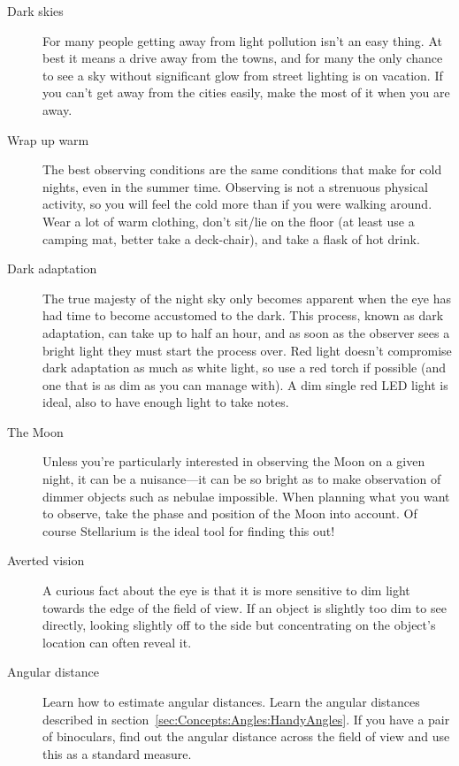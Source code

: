\begin{description}
\item[Dark skies] For many people getting away from light pollution
isn't an easy thing. At best it means a drive away from the towns, and
for many the only chance to see a sky without significant glow from
street lighting is on vacation. If you can't get away from the cities
easily, make the most of it when you are away.

\item[Wrap up warm] The best observing conditions are the same
conditions that make for cold nights, even in the summer time. Observing
is not a strenuous physical activity, so you will feel the cold %
more than if you were walking around. Wear a lot of warm clothing, don't
sit/lie on the floor (at least use a camping mat, better take a
deck-chair), and take a flask of hot drink.

\item[Dark adaptation] The true majesty of the night sky only
becomes apparent when the eye has had time to become accustomed to the
dark.  This process, known as dark adaptation, can take up to half an
hour, and as soon as the observer sees a bright light they must start
the process over. Red light doesn't compromise dark adaptation as much
as white light, so use a red torch if possible (and one that is as dim
as you can manage with). A dim single red LED light is ideal, also to
have enough light to take notes.

\item[The Moon] Unless you're particularly interested in observing the
Moon on a given night, it can be a nuisance---it can be so bright as
to make observation of dimmer objects such as nebulae impossible. When
planning what you want to observe, take the phase and position of the
Moon into account. Of course Stellarium is the ideal tool for finding
this out!

\item[Averted vision] A curious fact about the eye is that it is more
sensitive to dim light towards the edge of the field of view. If an
object is slightly too dim to see directly, looking slightly off to the
side but concentrating on the object's location can often reveal it.

\item[Angular distance] Learn how to estimate angular distances. Learn
  the angular distances described in
  section~\ref{sec:Concepts:Angles:HandyAngles}. If you have a pair of
  binoculars, find out the angular distance across the field of view
  and use this as a standard measure.
\end{description}


